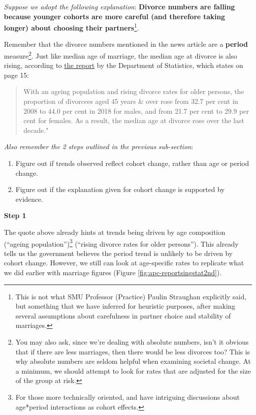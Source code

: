 \documentclass[openany]{book}
\providecommand{\tightlist}{%
  \setlength{\itemsep}{0pt}\setlength{\parskip}{0pt}}
\let\rmarkdownfootnote\footnote%
\def\footnote{\protect\rmarkdownfootnote}
\begin{document}
\emph{Suppose we adopt the following explanation}: \textbf{Divorce
numbers are falling because younger cohorts are more careful (and
therefore taking longer) about choosing their partners}\footnote{This is
  not what SMU Professor (Practice) Paulin Straughan explicitly said,
  but something that we have inferred for heuristic purposes, after
  making several assumptions about carefulness in partner choice and
  stability of marriages.}.

Remember that the divorce numbers mentioned in the news article are a
\textbf{period} measure\footnote{You may also ask, since we're dealing
  with absolute numbers, isn't it obvious that if there are less
  marriages, then there would be less divorces too? This is why absolute
  numbers are seldom helpful when examining societal change. At a
  minimum, we should attempt to look for rates that are adjusted for the
  size of the group at risk.}. Just like median age of marriage, the
median age at divorce is also rising, according to
\href{https://www.singstat.gov.sg/-/media/files/publications/population/smd2018.pdf}{the
report} by the Department of Statistics, which states on page 15:

\begin{quote}
With an ageing population and rising divorce rates for older persons,
the proportion of divorcees aged 45 years \& over rose from 32.7 per
cent in 2008 to 44.0 per cent in 2018 for males, and from 21.7 per cent
to 29.9 per cent for females. As a result, the median age at divorce
rose over the last decade."
\end{quote}

\emph{Also remember the 2 steps outlined in the previous sub-section}:

\begin{enumerate}
\def\labelenumi{\arabic{enumi}.}
\tightlist
\item
  Figure out if trends observed reflect cohort change, rather than age
  or period change.
\item
  Figure out if the explanation given for cohort change is supported by
  evidence.
\end{enumerate}

\textbf{Step 1}

The quote above already hints at trends being driven by age composition
(``ageing population'')\footnote{For those more technically oriented,
  \citet{martin_comment:_2009} and
  \citet{luo_age-period-cohort-interaction_2020} have intriguing
  discussions about age*period interactions as cohort effects.}
(``rising divorce rates for older persons''). This already tells us the
government believes the period trend is unlikely to be driven by cohort
change. However, we still can look at age-specific rates to replicate
what we did earlier with marriage figures (Figure
\ref{fig:apc-reportsingstat2nd}).
\end{document}
